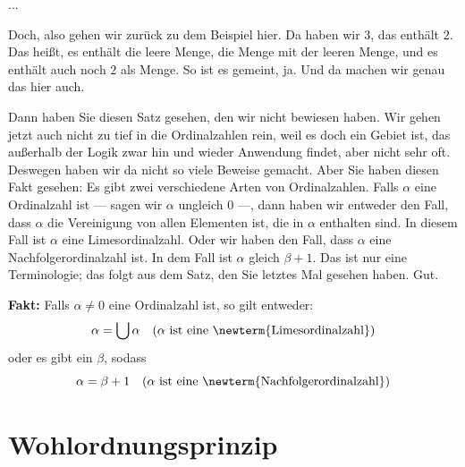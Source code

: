 \begin{student-interaction}[Studentenfrage]
...
\end{student-interaction}

\begin{spoken-clean}[00:16:25 - 00:19:20]
Doch, also gehen wir zurück zu dem Beispiel hier. Da haben wir $3$, das enthält $2$. Das heißt, es enthält die leere Menge, die Menge mit der leeren Menge, und es enthält auch noch $2$ als Menge. So ist es gemeint, ja. Und da machen wir genau das hier auch.

Dann haben Sie diesen Satz gesehen, den wir nicht bewiesen haben. Wir gehen jetzt auch nicht zu tief in die Ordinalzahlen rein, weil es doch ein Gebiet ist, das außerhalb der Logik zwar hin und wieder Anwendung findet, aber nicht sehr oft. Deswegen haben wir da nicht so viele Beweise gemacht. Aber Sie haben diesen Fakt gesehen: Es gibt zwei verschiedene Arten von Ordinalzahlen. Falls $\alpha$ eine Ordinalzahl ist --- sagen wir $\alpha$ ungleich $0$ ---, dann haben wir entweder den Fall, dass $\alpha$ die Vereinigung von allen Elementen ist, die in $\alpha$ enthalten sind. In diesem Fall ist $\alpha$ eine Limesordinalzahl. Oder wir haben den Fall, dass $\alpha$ eine Nachfolgerordinalzahl ist. In dem Fall ist $\alpha$ gleich $\beta + 1$. Das ist nur eine Terminologie; das folgt aus dem Satz, den Sie letztes Mal gesehen haben. Gut.
\end{spoken-clean}

\begin{math-stroke}
\textbf{Fakt:} Falls $\alpha \neq 0$ eine Ordinalzahl ist, so gilt entweder:
\[
\alpha = \bigcup \alpha \quad (\alpha \text{ ist eine \newterm{Limesordinalzahl}})
\]
oder es gibt ein $\beta$, sodass
\[
\alpha = \beta + 1 \quad (\alpha \text{ ist eine \newterm{Nachfolgerordinalzahl}})
\]
\end{math-stroke}

\begin{ai-global-state-checkpoint-invisible-content}
\end{ai-global-state-checkpoint-invisible-content}

\section{Wohlordnungsprinzip}

